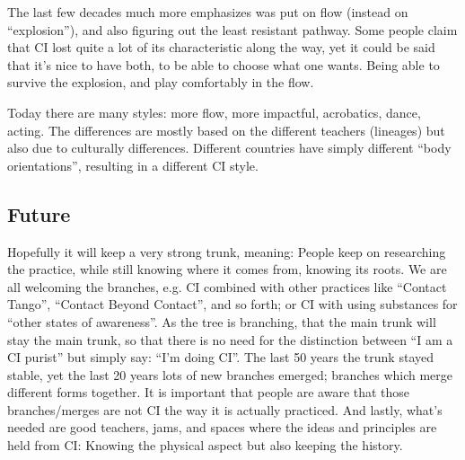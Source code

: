 The last few decades much more emphasizes was put on flow (instead on ``explosion''), and also figuring out the least resistant pathway.
Some people claim that CI lost quite a lot of its characteristic along the way, yet it could be said that it's nice to have both, to be able to choose what one wants.
Being able to survive the explosion, and play comfortably in the flow.

Today there are many styles: more flow, more impactful, acrobatics, dance, acting.
The differences are mostly based on the different teachers (lineages) but also due to culturally differences.
Different countries have simply different ``body orientations'', resulting in a different CI style.

\subsection{Future}\label{subsec:future}

Hopefully it will keep a very strong trunk, meaning: People keep on researching the practice, while still knowing where it comes from, knowing its roots.
We are all welcoming the branches, e.g. CI combined with other practices like ``Contact Tango'', ``Contact Beyond Contact'', and so forth; or CI with using substances for ``other states of awareness''.
As the tree is branching, that the main trunk will stay the main trunk, so that there is no need for the distinction between ``I am a CI purist'' but simply say: ``I'm doing CI''.
The last 50 years the trunk stayed stable, yet the last 20 years lots of new branches emerged; branches which merge different forms together.
It is important that people are aware that those branches/merges are not CI the way it is actually practiced.
And lastly, what's needed are good teachers, jams, and spaces where the ideas and principles are held from CI: Knowing the physical aspect but also keeping the history.
